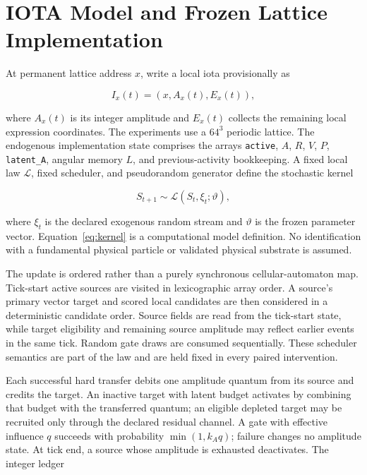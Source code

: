 \section{IOTA Model and Frozen Lattice Implementation}
\label{sec:model}

At permanent lattice address $x$, write a local iota provisionally as

\begin{equation}
I_x(t)=\left(x,A_x(t),E_x(t)\right),
\end{equation}

where $A_x(t)$ is its integer amplitude and $E_x(t)$ collects the remaining
local expression coordinates. The experiments use a $64^3$ periodic lattice.
The endogenous implementation state comprises the arrays
\texttt{active}, $A$, $R$, $V$, $P$, \texttt{latent\_A}, angular memory $L$,
and previous-activity bookkeeping. A fixed local law $\mathcal{L}$, fixed
scheduler, and pseudorandom generator define the stochastic kernel

\begin{equation}
S_{t+1}\sim\mathcal{L}(S_t,\xi_t;\vartheta),
\label{eq:kernel}
\end{equation}

where $\xi_t$ is the declared exogenous random stream and $\vartheta$ is the
frozen parameter vector. Equation~\ref{eq:kernel} is a computational model
definition. No identification with a fundamental physical particle or
validated physical substrate is assumed.

The update is ordered rather than a purely synchronous cellular-automaton map.
Tick-start active sources are visited in lexicographic array order. A source's
primary vector target and scored local candidates are then considered in a
deterministic candidate order. Source fields are read from the tick-start state,
while target eligibility and remaining source amplitude may reflect earlier
events in the same tick. Random gate draws are consumed sequentially. These
scheduler semantics are part of the law and are held fixed in every paired
intervention.

Each successful hard transfer debits one amplitude quantum from its source and
credits the target. An inactive target with latent budget activates by combining
that budget with the transferred quantum; an eligible depleted target may be
recruited only through the declared residual channel. A gate with effective
influence $q$ succeeds with probability
$\min(1,k_Aq)$; failure changes no amplitude state. At tick end, a source whose
amplitude is exhausted deactivates. The integer ledger

